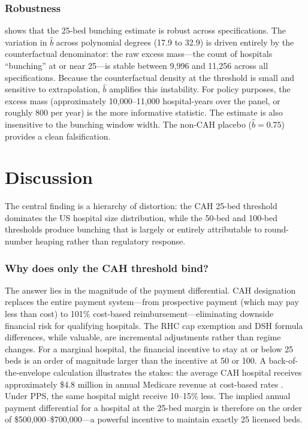 \documentclass[12pt]{article}
\begin{document}


\subsubsection*{Robustness}   shows that the 25-bed bunching estimate is robust across specifications. The variation in $\hat{b}$ across polynomial degrees (17.9 to 32.9) is driven entirely by the counterfactual denominator: the raw excess mass---the count of hospitals ``bunching'' at or near 25---is stable between 9,996 and 11,256 across all specifications. Because the counterfactual density at the threshold is small and sensitive to extrapolation, $\hat{b}$ amplifies this instability. For policy purposes, the excess mass (approximately 10,000--11,000 hospital-years over the panel, or roughly 800 per year) is the more informative statistic. The estimate is also insensitive to the bunching window width. The non-CAH placebo ($\hat{b} = 0.75$) provides a clean falsification.

\section{Discussion}

The central finding is a hierarchy of distortion: the CAH 25-bed threshold dominates the US hospital size distribution, while the 50-bed and 100-bed thresholds produce bunching that is largely or entirely attributable to round-number heaping rather than regulatory response.

\subsubsection*{Why does only the CAH threshold bind?}  The answer lies in the magnitude of the payment differential. CAH designation replaces the entire payment system---from prospective payment (which may pay less than cost) to 101\% cost-based reimbursement---eliminating downside financial risk for qualifying hospitals. The RHC cap exemption and DSH formula differences, while valuable, are incremental adjustments rather than regime changes. For a marginal hospital, the financial incentive to stay at or below 25 beds is an order of magnitude larger than the incentive at 50 or 100. A back-of-the-envelope calculation illustrates the stakes: the average CAH hospital receives approximately \$4.8 million in annual Medicare revenue at cost-based rates \citep{pink2004}. Under PPS, the same hospital might receive 10--15\% less. The implied annual payment differential for a hospital at the 25-bed margin is therefore on the order of \$500,000--\$700,000---a powerful incentive to maintain exactly 25 licensed beds.
\end{document}
